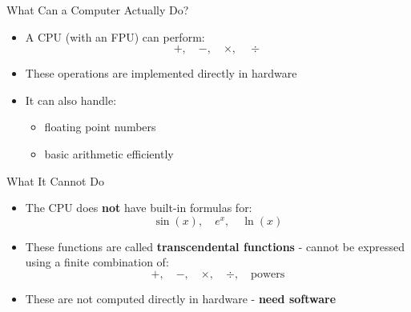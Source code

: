 \documentclass[10pt]{beamer}
\begin{document}
\begin{frame}{What Can a Computer Actually Do?}

\begin{itemize}
\item A CPU (with an FPU) can perform:
\[
+, \quad -, \quad \times, \quad \div
\]

\item These operations are implemented directly in hardware
\end{itemize}

\vspace{3mm}


\begin{itemize}
\item It can also handle:
\begin{itemize}
\item floating point numbers
\item basic arithmetic efficiently
\end{itemize}
\end{itemize}

\end{frame}

\begin{frame}{What It Cannot Do}

\begin{itemize}
\item The CPU does \textbf{not} have built-in formulas for:
\[
\sin(x), \quad e^x, \quad \ln(x)
\]

\item These functions are  called \textbf{transcendental functions} - cannot be expressed using a finite combination of:
\[
+, \quad -, \quad \times, \quad \div, \quad \text{powers}
\]


\item These are not computed directly in hardware - \textbf{need software}
\end{itemize}

\vspace{4mm}

\pause


\end{frame}
\end{document}
